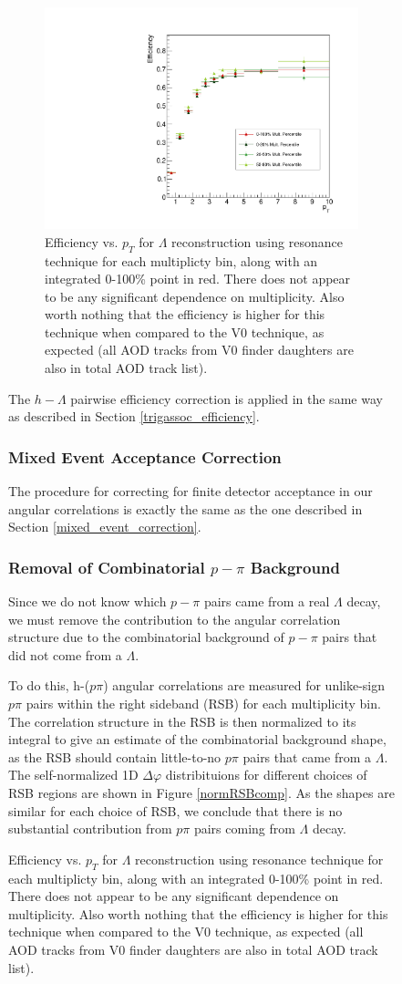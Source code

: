 \documentclass[ALICE,manyauthors]{ALICE_analysis_notes}
\begin{document}
\begin{figure}[ht]
\begin{figure}[ht]
\centering
\includegraphics[width=4in]{figures/res_efficiency.pdf}
\caption{Efficiency vs. $p_T$ for $\Lambda$ reconstruction using resonance technique for each multiplicty bin, along with an integrated 0-100\% point in red. There does not appear to be any significant dependence on multiplicity. Also worth nothing that the efficiency is higher for this technique when compared to the V0 technique, as expected (all AOD tracks from V0 finder daughters are also in total AOD track list).}
\label{lambda_eff_res}
\end{figure}

The $h-\Lambda$ pairwise efficiency correction is applied in the same way as described in Section \ref{trigassoc_efficiency}.

\subsubsection{Mixed Event Acceptance Correction}
\label{mixed_event_res}
The procedure for correcting for finite detector acceptance in our angular correlations is exactly the same as the one described in Section \ref{mixed_event_correction}.


\subsubsection{Removal of Combinatorial $p-\pi$ Background}
\label{removecomb}

Since we do not know which $p-\pi$ pairs came from a real $\Lambda$ decay, we must remove the contribution to the angular correlation structure due to the combinatorial background of $p-\pi$ pairs that did not come from a $\Lambda$.

To do this, h-($p\pi$) angular correlations are measured for unlike-sign $p\pi$ pairs within the right sideband (RSB) for each multiplicity bin. The correlation structure in the RSB is then normalized to its integral to give an estimate of the combinatorial background shape, as the RSB should contain little-to-no $p\pi$ pairs that came from a $\Lambda$. The self-normalized 1D $\Delta\varphi$ distribituions for different choices of RSB regions are shown in Figure \ref{normRSBcomp}. As the shapes are similar for each choice of RSB, we conclude that there is no substantial contribution from $p\pi$ pairs coming from $\Lambda$ decay.


\end{figure}
\end{document}
